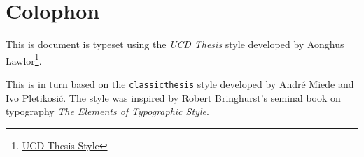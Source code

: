 \pagestyle{empty}

\hfill

\vfill


\section*{Colophon}
This is document is typeset using the \emph{UCD Thesis} style developed by Aonghus Lawlor\footnote{\href{https://github.com/aonghus/UCDThesis}{UCD Thesis Style}}.

This is in turn based on the \texttt{classicthesis} style developed by Andr\'e Miede and Ivo Pletikosić.
The style was inspired by Robert Bringhurst's seminal book on typography \emph{The Elements of Typographic Style}.

\bigskip

\noindent\finalVersionString

